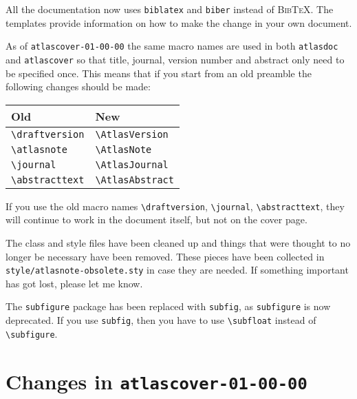\documentclass[koma,UKenglish]{style/atlasdoc}
\newcommand{\BibTeX}{\textsc{Bib\TeX}}
\newcommand{\Macro}[1]{\texttt{\textbackslash #1}\xspace}
\begin{document}
All the documentation now uses \texttt{biblatex} and \texttt{biber} instead of \BibTeX.
The templates provide information on how to make the change in your own document.

As of \texttt{atlascover-01-00-00} the same macro names are used in both \texttt{atlasdoc} and
\texttt{atlascover} so that title, journal, version number and abstract only need to be specified once.
This means that if you start from an old preamble the following changes should be made:
\begin{center}
	\begin{tabular}{ll}
		Old	& New\\
		\midrule
		\Macro{draftversion} & \Macro{AtlasVersion}\\
		\Macro{atlasnote} & \Macro{AtlasNote}\\
		\Macro{journal} & \Macro{AtlasJournal}\\
		\Macro{abstracttext} & \Macro{AtlasAbstract}
	\end{tabular}
\end{center}
If you use the old macro names 
\Macro{draftversion}, \Macro{journal}, \Macro{abstracttext},
they will continue to work in the document itself, but not on the cover page.

The class and style files have been cleaned up and things 
that were thought to no longer be necessary have been removed.
These pieces have been collected in \texttt{style/atlasnote-obsolete.sty} in case they are needed.
If something important has got lost, please let me know.

The \texttt{subfigure} package has been replaced with \texttt{subfig}, as \texttt{subfigure} is now deprecated.
If you use \texttt{subfig}, then you have to use \Macro{subfloat} instead of \Macro{subfigure}.

\section{Changes in \texttt{atlascover-01-00-00}}
\label{sec:oldcover}
\end{document}
